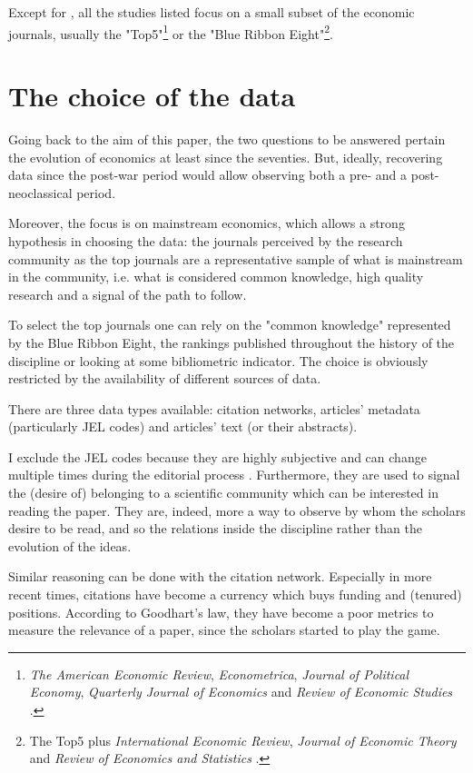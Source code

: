 \documentclass[a4paper, 11pt, headings=standardclasses, tablecaptionsbelow]{scrartcl}
\begin{document}
Except for \textcite{ambrosino2018}, all the studies listed focus on a small subset of the economic journals, usually the "Top5"\footnote{\textit{The American Economic Review}, \textit{Econometrica}, \textit{Journal of Political Economy}, \textit{Quarterly Journal of Economics} and \textit{Review of Economic Studies} \parencite{heckman2020}.} or the "Blue Ribbon Eight"\footnote{The Top5 plus \textit{International Economic Review}, \textit{Journal of Economic Theory} and \textit{Review of Economics and Statistics} \parencite{dusansky1998}.}.

\section{The choice of the data}
Going back to the aim of this paper, the two questions to be answered pertain the evolution of economics at least since the seventies. But, ideally, recovering data since the post-war period would allow observing both a pre- and a post-neoclassical period.

Moreover, the focus is on mainstream economics, which allows a strong hypothesis in choosing the data: the journals perceived by the research community as the top journals are a representative sample of what is mainstream in the community, i.e. what is considered common knowledge, high quality research and a signal of the path to follow.

To select the top journals one can rely on the "common knowledge" represented by the Blue Ribbon Eight, the rankings published throughout the history of the discipline or looking at some bibliometric indicator. The choice is obviously restricted by the availability of different sources of data.

There are three data types available: citation networks, articles' metadata (particularly JEL codes) and articles' text (or their abstracts).

I exclude the JEL codes because they are highly subjective and can change multiple times during the editorial process \parencite{kosnik2018}. Furthermore, they are used to signal the (desire of) belonging to a scientific community which can be interested in reading the paper. They are, indeed, more a way to observe by whom the scholars desire to be read, and so the relations inside the discipline rather than the evolution of the ideas.

Similar reasoning can be done with the citation network. Especially in more recent times, citations have become a currency which buys funding and (tenured) positions. According to Goodhart's law, they have become a poor metrics to measure the relevance of a paper, since the scholars started to play the game.
\end{document}
